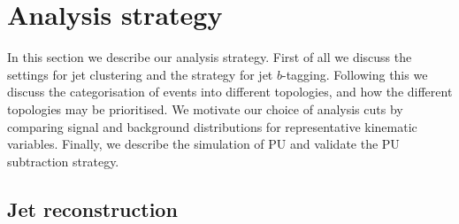 
\section{Analysis strategy}
\label{sec:analysis}

In this section we describe our analysis strategy.
%
First of all we discuss the settings
for jet clustering and the strategy for jet $b$-tagging.
%
Following this we discuss the categorisation of events into different
topologies, and how the different topologies may be prioritised.
%
We motivate our choice of analysis cuts by comparing signal and background
distributions for representative kinematic variables.
%
Finally, we describe the simulation of PU and validate
the PU subtraction strategy.

\subsection{Jet reconstruction}

